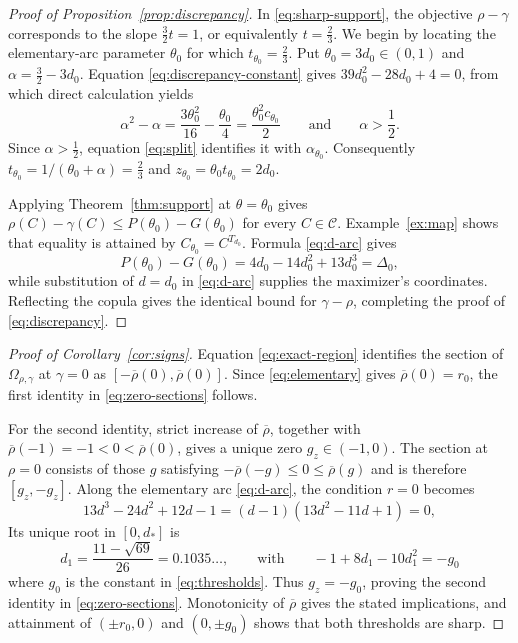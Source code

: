 \documentclass{article}
\newcommand{\rhogammaroot}{}
\renewcommand{\rhogammaroot}{rho_gamma_article/}}{}
\theoremstyle{definition}
\theoremstyle{remark}
\newcommand{\1}{\mathds{1}}
\newcommand{\CC}{\mathcal{C}}
\newcommand{\Om}{\Omega_{\rho,\gamma}}
\newcommand{\rhoup}{\overline{\rho}}
\begin{document}
\begin{proof}[Proof of Proposition~\ref{prop:discrepancy}]
	In \eqref{eq:sharp-support}, the objective $\rho-\gamma$ corresponds to the slope $\tfrac32t=1$, or equivalently $t=\tfrac23$.
	We begin by locating the elementary-arc parameter $\theta_0$ for which $t_{\theta_0}=\tfrac23$.
	Put $\theta_0=3d_0\in(0,1)$ and $\alpha=\tfrac32-3d_0$.
	Equation \eqref{eq:discrepancy-constant} gives $39d_0^2-28d_0+4=0$, from which direct calculation yields
	\[
		\alpha^2-\alpha=\frac{3\theta_0^2}{16}-\frac{\theta_0}{4}=\frac{\theta_0^2c_{\theta_0}}{2}\qquad\text{and}\qquad\alpha>\frac12.
	\]
	Since $\alpha>\tfrac12$, equation \eqref{eq:split} identifies it with $\alpha_{\theta_0}$. Consequently $t_{\theta_0}=1/(\theta_0+\alpha)=\tfrac23$ and $z_{\theta_0}=\theta_0t_{\theta_0}=2d_0$.

	Applying Theorem~\ref{thm:support} at $\theta=\theta_0$ gives $\rho(C)-\gamma(C)\le P(\theta_0)-G(\theta_0)$ for every $C\in\CC$. Example~\ref{ex:map} shows that equality is attained by $C_{\theta_0}=C^{T_{d_0}}$.
	Formula \eqref{eq:d-arc} gives
	\[
		P(\theta_0)-G(\theta_0)=4d_0-14d_0^2+13d_0^3=\Delta_0,
	\]
	while substitution of $d=d_0$ in \eqref{eq:d-arc} supplies the maximizer's coordinates.
	Reflecting the copula gives the identical bound for $\gamma-\rho$, completing the proof of \eqref{eq:discrepancy}.
\end{proof}

\begin{proof}[Proof of Corollary~\ref{cor:signs}]
	Equation \eqref{eq:exact-region} identifies the section of $\Om$ at $\gamma=0$ as $[-\rhoup(0),\rhoup(0)]$. Since \eqref{eq:elementary} gives $\rhoup(0)=r_0$, the first identity in \eqref{eq:zero-sections} follows.

	For the second identity, strict increase of $\rhoup$, together with $\rhoup(-1)=-1<0<\rhoup(0)$, gives a unique zero $g_z\in(-1,0)$. The section at $\rho=0$ consists of those $g$ satisfying $-\rhoup(-g)\le0\le\rhoup(g)$ and is therefore $[g_z,-g_z]$.
	Along the elementary arc \eqref{eq:d-arc}, the condition $r=0$ becomes
	\[
		13d^3-24d^2+12d-1=(d-1)(13d^2-11d+1)=0,
	\]
	Its unique root in $[0,d_*]$ is
	\[
		d_1=\frac{11-\sqrt{69}}{26}=0.1035\ldots,\qquad\text{with}\qquad -1+8d_1-10d_1^2=-g_0
	\]
	where $g_0$ is the constant in \eqref{eq:thresholds}. Thus $g_z=-g_0$, proving the second identity in \eqref{eq:zero-sections}.
	Monotonicity of $\rhoup$ gives the stated implications, and attainment of $(\pm r_0,0)$ and $(0,\pm g_0)$ shows that both thresholds are sharp.
\end{proof}



\end{document}

